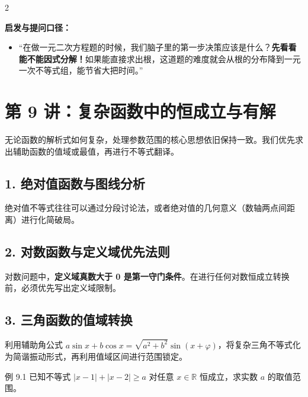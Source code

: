 \documentclass[11pt,a4paper]{ctexart}
\begin{document}
\begin{paracol}{2}
{  \textbf{启发与提问口径：}\\
  \begin{itemize}
    \item “在做一元二次方程题的时候，我们脑子里的第一步决策应该是什么？\textbf{先看看能不能因式分解！}如果能直接求出根，这道题的难度就会从根的分布降到一元一次不等式组，能节省大把时间。”
  \end{itemize}
}
\end{paracol}

\newpage

\section{第 9 讲：复杂函数中的恒成立与有解}

无论函数的解析式如何复杂，处理参数范围的核心思想依旧保持一致。我们优先求出辅助函数的值域或最值，再进行不等式翻译。

\subsection{1. 绝对值函数与图线分析}
绝对值不等式往往可以通过分段讨论法，或者绝对值的几何意义（数轴两点间距离）进行化简破局。

\subsection{2. 对数函数与定义域优先法则}
对数问题中，\textbf{定义域真数大于 0 是第一守门条件}。在进行任何对数恒成立转换前，必须优先写出定义域限制。

\subsection{3. 三角函数的值域转换}
利用辅助角公式 $a\sin x + b\cos x = \sqrt{a^2+b^2}\sin(x+\varphi)$，将复杂三角不等式化为简谐振动形式，再利用值域区间进行范围锁定。

\begin{exbox}{例 9.1}
已知不等式 $|x-1| + |x-2| \ge a$ 对任意 $x \in \mathbb R$ 恒成立，求实数 $a$ 的取值范围。
\end{exbox}
\end{document}
